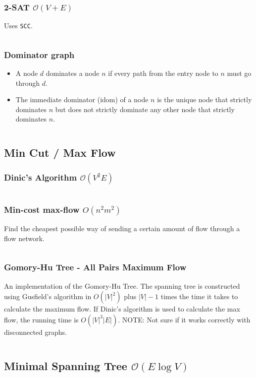 \documentclass[9pt,a4paper,landscape,oneside]{amsart}
\newcommand{\mintedstyle}[2]{\inputminted{#1}{code/#2}}
\newcommand{\code}[1]{\mintedstyle{cpp}{#1}}
\newenvironment{myitemize}
{\begin{itemize}[leftmargin=.3cm]
	\setlength{\itemsep}{0pt}
	\setlength{\parskip}{0pt}
	\setlength{\parsep}{0pt}     }
{ \end{itemize}                  }
\begin{document}
\begin{multicols*}{3}
\subsubsection{2-SAT $\mathcal{O}(V+E)$}
Uses \texttt{SCC}.
\code{satsolver.cpp}

\subsubsection{Dominator graph}
\begin{myitemize}
\item
	A node $d$ dominates a node $n$ if every path from the entry node to $n$ must go through $d$.	
\item
	The immediate dominator (idom) of a node $n$ is the unique node that strictly dominates $n$ but does not strictly dominate any other node that strictly dominates $n$.
\end{myitemize}
\code{graphs/dominator.cpp}

\subsection{Min Cut / Max Flow}
\subsubsection{Dinic's Algorithm $\mathcal{O}(V^{2} E)$}
\code{graphs/dinic.cpp}

\subsubsection{Min-cost max-flow $O(n^2 m^2)$}
Find the cheapest possible way of sending a certain amount of flow through a flow network.
\code{graphs/mincostmaxflow.cpp}

\subsubsection{Gomory-Hu Tree - All Pairs Maximum Flow}
An implementation of the Gomory-Hu Tree. The spanning tree is constructed using Gusfield's algorithm
in $O(|V| ^ 2)$ plus $|V|-1$ times the time it takes to calculate the maximum flow.
If Dinic's algorithm is used to calculate the max flow, the running time is $O(|V|^3|E|)$.
NOTE: Not sure if it works correctly with disconnected graphs.
\code{graphs/gomory_hu_tree.cpp}

\subsection{Minimal Spanning Tree $\mathcal{O}(E \log V)$}


\end{multicols*}
\end{document}
